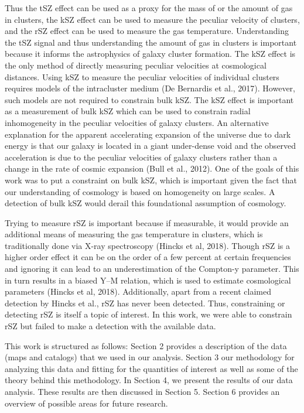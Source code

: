 \documentclass{princeton_astro_thesis}
\begin{document}
\par Thus the tSZ effect can be used as a proxy for the mass of or the amount of gas in clusters, the kSZ effect can be used to measure the peculiar velocity of clusters, and the rSZ effect can be used to measure the gas temperature. Understanding the tSZ signal and thus understanding the amount of gas in clusters is important because it informs the astrophysics of galaxy cluster formation. The kSZ effect is the only method of directly measuring peculiar velocities at cosmological distances. Using kSZ to measure the peculiar velocities of individual clusters requires models of the intracluster medium (De Bernardis et al., 2017). However, such models are not required to constrain bulk kSZ. The kSZ effect is important as a measurement of bulk kSZ which can be used to constrain radial inhomogeneity in the peculiar velocities of galaxy clusters. An alternative explanation for the apparent accelerating expansion of the universe due to dark energy is that our galaxy is located in a giant under-dense void and the observed acceleration is due to the peculiar velocities of galaxy clusters rather than a change in the rate of cosmic expansion (Bull et al., 2012). One of the goals of this work was to put a constraint on bulk kSZ, which is important given the fact that our understanding of cosmology is based on homogeneity on large scales. A detection of bulk kSZ would derail this foundational assumption of cosmology.
\par Trying to measure rSZ is important because if measurable, it would provide an additional means of measuring the gas temperature in clusters, which is traditionally done via X-ray spectroscopy (Hincks et al, 2018). Though rSZ is a higher order effect it can be on the order of a few percent at certain frequencies and ignoring it can lead to an underestimation of the Compton-y parameter. This in turn results in a biased Y--M relation, which is used to estimate cosmological parameters (Hincks et al, 2018). Additionally, apart from a recent claimed detection by Hincks et al., rSZ has never been detected. Thus, constraining or detecting rSZ is itself a topic of interest. In this work, we were able to constrain rSZ but failed to make a detection with the available data.
\par This work is structured as follows: Section 2 provides a description of the data (maps and catalogs) that we used in our analysis. Section 3 our methodology for analyzing this data and fitting for the quantities of interest as well as some of the theory behind this methodology. In Section 4, we present the results of our data analysis. These results are then discussed in Section 5. Section 6 provides an overview of possible areas for future research. 
\end{document}
